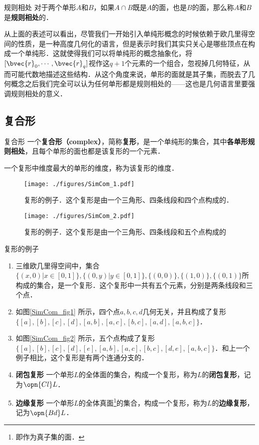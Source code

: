 \begin{definition}{规则相处}
对于两个单形$A$和$B$，如果$A\cap B$既是$A$的面，也是$B$的面，那么称$A$和$B$是\textbf{规则相处}的．
\end{definition}


从上面的表述可以看出，尽管我们一开始引入单纯形概念的时候依赖于欧几里得空间的性质，是一种高度几何化的语言，但是表示时我们其实只关心是哪些顶点在构成一个单纯形．这就使得我们可以将单纯形的概念抽象化，将$[\bvec{r}_0, \cdots, \bvec{r}_q]$视作这$q+1$个元素的一个组合，忽视掉几何特征，从而可能代数地描述这些结构．从这个角度来说，单形的面就是其子集，而脱去了几何概念之后我们完全可以认为任何单形都是规则相处的——这也是几何语言里要强调规则相处的意义．

\subsection{复合形}

\begin{definition}{复合形}
一个\textbf{复合形（complex）}，简称\textbf{复形}，是一个单纯形的集合，其中\textbf{各单形规则相处}，且每个单形的面也都是该复形的一个元素．

一个复形中维度最大的单形的维度，称为该复形的维度．
\end{definition}

\begin{figure}[ht]
\centering
\texttt{[image: ./figures/SimCom\_1.pdf]}
\caption{复形的例子．这个复形是由一个三角形、四条线段和四个点构成的．} \label{SimCom_fig1}
\end{figure}

\begin{figure}[ht]
\centering
\texttt{[image: ./figures/SimCom\_2.pdf]}
\caption{复形的例子．这个复形是由一个三角形、四条线段和五个点构成的} \label{SimCom_fig2}
\end{figure}


\begin{example}{复形的例子}
\begin{enumerate}
\item 三维欧几里得空间中，集合$\{(x, 0)|x\in[0,1]\}, \{(0, y)|y\in[0, 1]\}, \{(0, 0)\}, \{(1, 0)\}, \{(0, 1)\}$所构成的集合，是一个复形．这个复形中一共有五个元素，分别是两条线段和三个点．
\item 如图\autoref{SimCom_fig1} 所示，四个点$a, b, c, d$几何无关，并且构成了复形$\{[a], [b], [c], [d], [a, b], [a, c], [b, c], [a, d], [a, b, c]\}$．
\item 如图\autoref{SimCom_fig2} 所示，五个点构成了复形$\{[a], [b], [c], [d], [e], [a, b], [a, c], [b, c], [d, e], [a, b, c]\}$．和上一个例子相比，这个复形是有两个连通分支的．
\item \textbf{闭包复形} 一个单形$L$的全体面的集合，构成一个复形，称为$L$的\textbf{闭包复形}，记为$\opn{Cl} L$．
\item \textbf{边缘复形} 一个单形$L$的全体真面\footnote{即作为真子集的面．}的集合，构成一个复形，称为$L$的\textbf{边缘复形}，记为$\opn{Bd} L$．
\end{enumerate}
\end{example}

